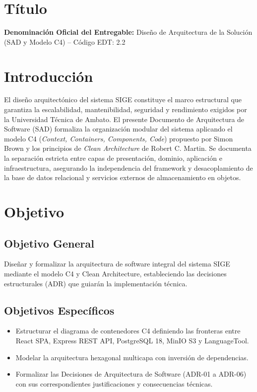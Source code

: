\documentclass[12pt,a4paper]{article}
\begin{document}
\section{Título}
\textbf{Denominación Oficial del Entregable:} Diseño de Arquitectura de la Solución (SAD y Modelo C4) -- Código EDT: 2.2

\section{Introducción}
El diseño arquitectónico del sistema SIGE constituye el marco estructural que garantiza la escalabilidad, mantenibilidad, seguridad y rendimiento exigidos por la Universidad Técnica de Ambato. El presente Documento de Arquitectura de Software (SAD) formaliza la organización modular del sistema aplicando el modelo C4 (\textit{Context, Containers, Components, Code}) propuesto por Simon Brown y los principios de \textit{Clean Architecture} de Robert C. Martin. Se documenta la separación estricta entre capas de presentación, dominio, aplicación e infraestructura, asegurando la independencia del framework y desacoplamiento de la base de datos relacional y servicios externos de almacenamiento en objetos.

\section{Objetivo}
\subsection{Objetivo General}
Diseñar y formalizar la arquitectura de software integral del sistema SIGE mediante el modelo C4 y Clean Architecture, estableciendo las decisiones estructurales (ADR) que guiarán la implementación técnica.
\subsection{Objetivos Específicos}
\begin{itemize}[leftmargin=1.5em, itemsep=2pt]
    \item Estructurar el diagrama de contenedores C4 definiendo las fronteras entre React SPA, Express REST API, PostgreSQL 18, MinIO S3 y LanguageTool.
    \item Modelar la arquitectura hexagonal multicapa con inversión de dependencias.
    \item Formalizar las Decisiones de Arquitectura de Software (ADR-01 a ADR-06) con sus correspondientes justificaciones y consecuencias técnicas.
\end{itemize}
\end{document}
